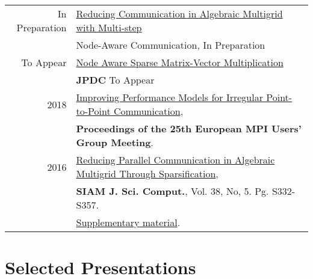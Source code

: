\documentclass[a4paper,10pt]{article} %
\begin{document}
\begin{longtable}{rl}	

    \textsc{}In Preparation  
    &\href{}{Reducing Communication in Algebraic Multigrid with Multi-step}\\
    &{Node-Aware Communication}, In Preparation\\


    \textsc{} To Appear & \href{https://arxiv.org/abs/1611.08060}{
    Node Aware Sparse Matrix-Vector Multiplication}\\
 & \normalsize\textbf{JPDC} To Appear\\

    \textsc{} 2018 
    &\href{https://dl.acm.org/citation.cfm?doid=3236367.3236368}{Improving
    Performance Models for Irregular Point-to-Point Communication},\\
    &\normalsize\textbf{Proceedings of the 25th European MPI Users' Group
    Meeting}.\\


    \textsc{} 2016 
    &\href{http://computation.llnl.gov/projects/hypre-scalable-linear-solvers-multigrid-methods/sparsification-2016.pdf}{Reducing Parallel Communication in Algebraic Multigrid Through Sparsification},\\
    &\normalsize\textbf{SIAM J. Sci. Comput.}, Vol. 38, No, 5.  Pg. S332-S357.\\
    &\href{http://computation.llnl.gov/projects/hypre-scalable-linear-solvers-multigrid-methods/sparsification-2016-supplement.pdf}{Supplementary material}.\\

\end{longtable}

\section{Selected Presentations}
\end{document}
